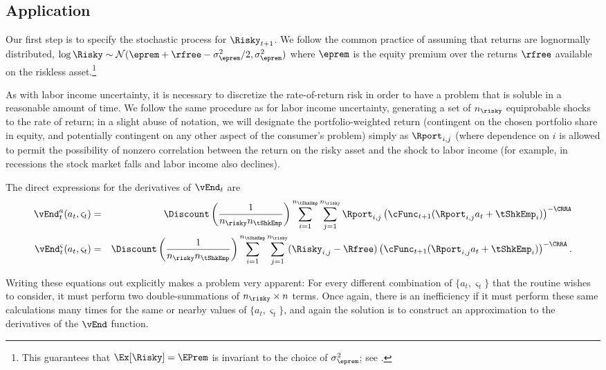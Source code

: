 \documentclass[titlepage]{\econtex}
\begin{document}
\subsection{Application}

Our first step is to specify the stochastic process for $\Risky_{t+1}$.
We follow the common practice of assuming that returns are
lognormally distributed, $\log \Risky \sim
\mathcal{N}(\eprem+\rfree-\sigma^{2}_{\eprem}/2,\sigma^{2}_{\eprem})$ where $\eprem$ is the equity premium
over the returns $\rfree$ available on the riskless asset.\footnote{This guarantees that $\Ex[\Risky] = \EPrem$ is invariant to the choice of $\sigma^{2}_{\eprem}$; see .}

As with labor income uncertainty, it is necessary to discretize the
rate-of-return risk in order to have a problem that is soluble in a
reasonable amount of time.  We follow the same procedure as for labor
income uncertainty, generating a set of $n_{\risky}$ equiprobable shocks to the
rate of return; in a slight abuse of notation, we will designate
the portfolio-weighted return (contingent on the
chosen portfolio share in equity, and potentially contingent on any other
aspect of the consumer's problem) simply as $\Rport_{i,j}$ (where dependence
on $i$ is allowed to permit the possibility of nonzero correlation
between the return on the risky asset and the shock to labor income (for example,
in recessions the stock market falls and labor income also declines).

The direct expressions for the derivatives of $\vEnd_{t}$ are
\begin{eqnarray}
        \vEnd_{t}^{{a}}({a}_{t},\varsigma_{t}) & = & \Discount \left(\frac{1}{n_{\risky} n_{\tShkEmp}}\right)\sum_{i=1}^{n_{\tShkEmp}}\sum_{j=1}^{n_{\risky} }\Rport_{i,j} \left(\cFunc_{t+1}(\Rport_{i,j}{a}_{t}+\tShkEmp_{i})\right)^{-\CRRA}
\\      \vEnd_{t}^{\varsigma}({a}_{t},\varsigma_{t}) & = & \Discount \left(\frac{1}{n_{\risky} n_{\tShkEmp}}\right)\sum_{i=1}^{n_{\tShkEmp}}\sum_{j=1}^{n_{\risky} }(\Risky_{i,j}-\Rfree)\left(\cFunc_{t+1}(\Rport_{i,j}{a}_{t}+\tShkEmp_{i})\right)^{-\CRRA}.
\end{eqnarray}

Writing these equations out explicitly makes a problem very
apparent: For every different combination of $\{{a}_{t},\varsigma_{t}\}$
that the routine wishes to consider, it must perform two
double-summations of $n_{\risky} \times n$ terms.  Once again, there is an
inefficiency if it must perform these same calculations many times
for the same or nearby values of $\{{a}_{t},\varsigma_{t}\}$, and again
the solution is to construct an approximation to the derivatives of
the $\vEnd$ function.
\end{document}

